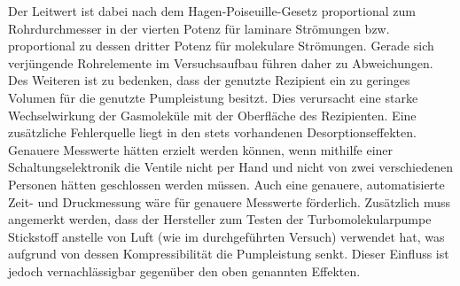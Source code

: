 Der Leitwert ist dabei nach dem Hagen-Poiseuille-Gesetz proportional zum Rohrdurchmesser in der vierten Potenz für laminare Strömungen bzw. proportional zu dessen dritter Potenz für molekulare Strömungen. Gerade sich verjüngende Rohrelemente im Versuchsaufbau führen daher zu Abweichungen. Des Weiteren ist zu bedenken, dass der genutzte Rezipient ein zu geringes Volumen für die genutzte Pumpleistung besitzt. Dies verursacht eine starke Wechselwirkung der Gasmoleküle mit der Oberfläche des Rezipienten. Eine zusätzliche Fehlerquelle liegt in den stets vorhandenen Desorptionseffekten. Genauere Messwerte hätten erzielt werden können, wenn mithilfe einer Schaltungselektronik die Ventile nicht per Hand und nicht von zwei verschiedenen Personen hätten geschlossen werden müssen. Auch eine genauere, automatisierte Zeit- und Druckmessung wäre für genauere Messwerte förderlich. Zusätzlich muss angemerkt werden, dass der Hersteller zum Testen der Turbomolekularpumpe Stickstoff anstelle von Luft (wie im durchgeführten Versuch) verwendet hat, was aufgrund von dessen Kompressibilität die Pumpleistung senkt. Dieser Einfluss ist jedoch vernachlässigbar gegenüber den oben genannten Effekten.
